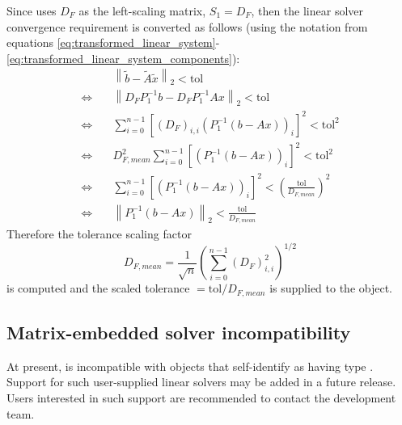 Since {\kinsol} uses $D_F$ as the left-scaling matrix, $S_1 = D_F$,
then the linear solver convergence requirement is converted as follows
(using the notation from equations
\eqref{eq:transformed_linear_system}-\eqref{eq:transformed_linear_system_components}):
\begin{align*}
  &\left\| \tilde{b} - \tilde{A} \tilde{x} \right\|_2  <  \text{tol}\\
  \Leftrightarrow \quad & \left\| D_F P_1^{-1} b - D_F P_1^{-1} A x \right\|_2  <  \text{tol}\\
  \Leftrightarrow \quad & \sum_{i=0}^{n-1} \left[(D_F)_{i,i} \left(P_1^{-1} (b - A x)\right)_i\right]^2  <  \text{tol}^2\\
  \Leftrightarrow \quad & D_{F,mean}^2 \sum_{i=0}^{n-1} \left[\left(P_1^{-1} (b - A x)\right)_i\right]^2  <  \text{tol}^2\\
  \Leftrightarrow \quad & \sum_{i=0}^{n-1} \left[\left(P_1^{-1} (b - A x)\right)_i\right]^2  <  \left(\frac{\text{tol}}{D_{F,mean}}\right)^2\\
  \Leftrightarrow \quad & \left\| P_1^{-1} (b - A x)\right\|_2  <  \frac{\text{tol}}{D_{F,mean}}
\end{align*}
Therefore the tolerance scaling factor
\[
  D_{F,mean} = \frac{1}{\sqrt{n}}\left(\sum_{i=0}^{n-1} (D_F)_{i,i}^2\right)^{1/2}
\]
is computed and the scaled tolerance $= \text{tol} / D_{F,mean}$ is
supplied to the {\sunlinsol} object.

\subsection{Matrix-embedded solver incompatibility}
\label{ss:sunlinsol_matrix_embedded}

At present, {\kinls} is incompatible with {\sunlinsol} objects that self-identify as having type
.  Support for such user-supplied linear solvers may be 
added in a future release.  Users interested in such support are recommended to contact the 
{\sundials} development team.



















